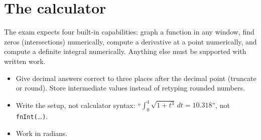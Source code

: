 \documentclass{apcalc}
\begin{document}
\section{The calculator}
The exam expects four built-in capabilities: graph a function in any window, find zeros (intersections) numerically, compute a derivative at a point numerically, and compute a definite integral numerically. Anything else must be supported with written work.
\begin{itemize}
\item Give decimal answers correct to three places after the decimal point (truncate or round). Store intermediate values instead of retyping rounded numbers.
\item Write the setup, not calculator syntax: ``$\int_0^4\sqrt{1+t^3}\,dt=10.318$'', not \texttt{fnInt(}\dots\texttt{)}.
\item Work in radians.
\end{itemize}
\end{document}
